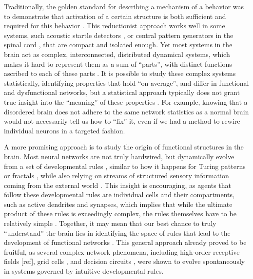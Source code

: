 \documentclass{article}
\begin{document}
Traditionally, the golden standard for describing a mechanism of a behavior was to demonstrate that activation of a certain structure is both sufficient and required for this behavior \citep{krakauer2017reductionist}. This reductionist approach works well in some systems, such acoustic startle detectors \citep{korn2005mauthner}, or central pattern generators in the spinal cord \citep{roberts2010hatchling}, that are compact and isolated enough. Yet most systems in the brain act as complex, interconnected, distributed dynamical systems, which makes it hard to represent them as a sum of “parts”, with distinct functions ascribed to each of these parts \citep{gao2015simplicity}. It is possible to study these complex systems statistically, identifying properties that hold “on average”, and differ in functional and dysfunctional networks, but a statistical approach typically does not grant true insight into the “meaning” of these properties \citep{bassett2018models}. For example, knowing that a disordered brain does not adhere to the same network statistics as a normal brain would not necessarily tell us how to “fix” it, even if we had a method to rewire individual neurons in a targeted fashion.

A more promising approach is to study the origin of functional structures in the brain. Most neural networks are not truly hardwired, but dynamically evolve from a set of developmental rules \citep{pietri2017emergence}, similar to how it happens for Turing patterns or fractals \citep{lefevre2010reaction,bullmore2012economy}, while also relying on streams of structured sensory information coming from the external world \citep{gao2015simplicity}. This insight is encouraging, as agents that follow these developmental rules are individual cells and their compartments, such as active dendrites and synapses, which implies that while the ultimate product of these rules is exceedingly complex, the rules themselves have to be relatively simple \citep{bassett2018models}. Together, it may mean that our best chance to truly “understand” the brain lies in identifying the space of rules that lead to the development of functional networks \citep{linderman2017constrain}. This general approach already proved to be fruitful, as several complex network phenomena, including high-order receptive fields [ref], grid cells \citep{banino2018grid}, and decision circuits \citep{haesemeyer2018convergent}, were shown to evolve spontaneously in systems governed by intuitive developmental rules. 
\end{document}
